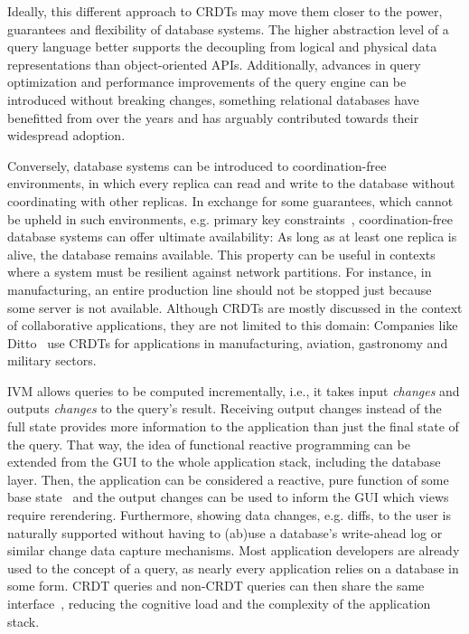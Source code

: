 Ideally, this different approach to \acp{CRDT} may move them closer to the power,
guarantees and flexibility of database systems.
The higher abstraction level of a query language better supports the decoupling
from logical and physical data representations than object-oriented \acsp{API}.
Additionally, advances in query optimization and performance improvements
of the query engine can be introduced without breaking changes,
something relational databases have benefitted from over the years and
has arguably contributed towards their widespread adoption.

Conversely, database systems can be introduced to coordination-free environments,
in which every replica can read and write to the database without
coordinating with other replicas.
In exchange for some guarantees, which cannot be upheld in such environments,
e.g. primary key constraints~\cite{bailis2014coordination},
coordination-free database systems can offer ultimate availability:
As long as at least one replica is alive, the database remains available.
This property can be useful in contexts where a system must be resilient
against network partitions.
For instance, in manufacturing, an entire production line should not be stopped
just because some server is not available.
Although \acp{CRDT} are mostly discussed in the context of collaborative
applications, they are not limited to this domain:
Companies like Ditto~\cite{dittoinc} use \acp{CRDT} for applications in
manufacturing, aviation, gastronomy and military sectors.

\Acl{IVM} allows queries to be computed incrementally, i.e., it takes input
\emph{changes} and outputs \emph{changes} to the query's result.
Receiving output changes instead of the full state provides more information
to the application than just the final state of the query.
That way, the idea of functional reactive programming can be extended from
the \acs{GUI} to the whole application stack, including the database layer.
Then, the application can be considered a reactive, pure function
of some base state~\cite{litt2023riffle} and the output changes can be used
to inform the \acs{GUI} which views require rerendering.
Furthermore, showing data changes, e.g. diffs, to the user is naturally supported
without having to (ab)use a database's write-ahead log or similar change
data capture mechanisms.
Most application developers are already used to the concept of a query,
as nearly every application relies on a database in some form.
\ac{CRDT} queries and non-\ac{CRDT} queries can then share the
same interface~\cite{litt2023riffle},
reducing the cognitive load and the complexity of the application stack.

